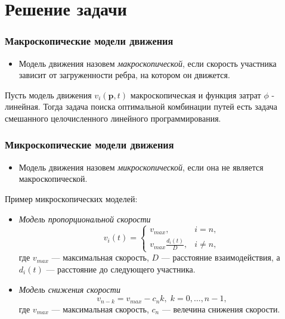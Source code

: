\documentclass{beamer}
\begin{document}
\section{Решение задачи}

\begin{frame}\frametitle{Макроскопические модели движения}
	\begin{itemize}
	\item Модель движения назовем \textit{макроскопической}, если скорость участника зависит от загруженности ребра, на котором он движется.
	\end{itemize}

	\begin{theorem}
	Пусть модель движения $ v_i(\textbf{p}, t)$ макроскопическая и функция затрат $\phi$ - линейная. Тогда задача поиска оптимальной комбинации путей есть задача смешанного целочисленного линейного программирования.
	\end{theorem}
\end{frame}

\begin{frame}\frametitle{Микроскопические модели движения}
	\begin{itemize}
		\item Модель движения назовем \textit{микроскопической}, если она не является макроскопической.
	\end{itemize}
	
	\bigskip
	Пример микроскопических моделей:
	\begin{itemize}
		\item \textit{Модель пропорциональной скорости}
		\begin{equation}
			\label{eq:micro}
			v_i(t)=
			\begin{cases}
				v_{max}, & i = n,
				\\
				v_{max} \frac{d_i(t)}{D} ,& i \ne n,
			\end{cases}
		\end{equation}
	где $v_{max}$ --- максимальная скорость, $D$ --- расстояние взаимодействия, а $d_i(t)$ --- расстояние до следующего участника.
	
	\item \textit{Модель снижения скорости}
	\begin{equation}
		v_{n - k} = v_{max} - c_n k, \; k = 0, \dots, n - 1,
	\end{equation}
	где $v_{max}$ --- максимальная скорость, $c_n$ --- велечина снижения скорости.
	
	\end{itemize}
\end{frame}
\end{document}
